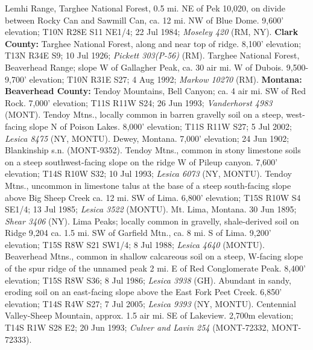 Lemhi Range, Targhee National Forest, 0.5 mi. NE of Pek 10,020, on divide
between Rocky Can and Sawmill Can, ca. 12 mi. NW of Blue Dome. 9,600' elevation;
T10N R28E S11 NE1/4; 22 Jul 1984; \textit{Moseley 420} (RM, NY).
  \textbf{Clark County:}
Targhee National Forest, along and near top of ridge. 8,100' elevation;
T13N R34E S9; 10 Jul 1926; \textit{Pickett 303(P-56)} (RM).
Targhee National Forest, Beaverhead Range; slope W of Gallagher Peak, ca. 30
air mi. W of Dubois. 9,500-9,700' elevation; T10N R31E S27; 4 Aug 1992;
\textit{Markow 10270} (RM).
  \textbf{Montana:}
  \textbf{Beaverhead County:}
Tendoy Mountains, Bell Canyon; ca. 4 air mi. SW of Red Rock. 7,000’ elevation;
T11S R11W S24; 26 Jun 1993; \textit{Vanderhorst 4983} (MONT).
Tendoy Mtns., locally common in barren gravelly soil on a steep, west-facing
slope N of Poison Lakes. 8,000’ elevation; T11S R11W S27; 5 Jul 2002;
\textit{Lesica 8475} (NY, MONTU).
Dewey, Montana. 7,000' elevation; 24 Jun 1902; Blankinship s.n. (MONT-9352).
Tendoy Mtns., common in stony limestone soils on a steep southwest-facing slope
on the ridge W of Pileup canyon. 7,600' elevation; T14S R10W S32; 10 Jul 1993;
\textit{Lesica 6073} (NY, MONTU).
Tendoy Mtns., uncommon in limestone talus at the base of a steep south-facing
slope above Big Sheep Creek ca. 12 mi. SW of Lima. 6,800' elevation;
T15S R10W S4 SE1/4; 13 Jul 1985; \textit{Lesica 3522} (MONTU).
Mt. Lima, Montana. 30 Jun 1895; \textit{Shear 3406} (NY).
Lima Peaks; locally common in gravelly, shale-derived soil on Ridge 9,204 ca.
1.5 mi. SW of Garfield Mtn., ca. 8 mi. S of Lima. 9,200' elevation;
T15S R8W S21 SW1/4; 8 Jul 1988; \textit{Lesica 4640} (MONTU).
Beaverhead Mtns., common in shallow calcareous soil on a steep, W-facing slope
of the spur ridge of the unnamed peak 2 mi. E of Red Conglomerate Peak.
8,400’ elevation; T15S R8W S36; 8 Jul 1986; \textit{Lesica 3938} (GH).
Abundant in sandy, eroding soil on an east-facing slope above the East Fork
Peet Creek. 6,850' elevation; T14S R4W S27; 7 Jul 2005;
\textit{Lesica 9393} (NY, MONTU).
Centennial Valley-Sheep Mountain, approx. 1.5 air mi. SE of Lakeview.
2,700m elevation; T14S R1W S28 E2; 20 Jun 1993;
\textit{Culver and Lavin 254} (MONT-72332, MONT-72333).

